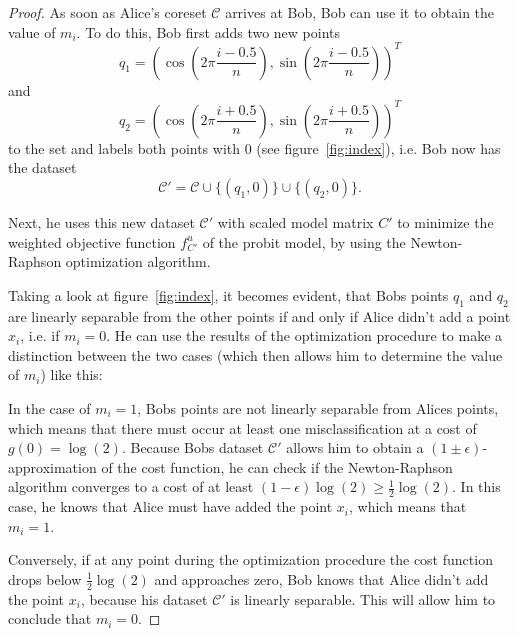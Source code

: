 \begin{proof}
    As soon as Alice's coreset $\mathcal{C}$ arrives at Bob,
    Bob can use it to obtain the value of $m_i$.
    To do this, Bob first adds two new points
    \begin{equation*}
        q_1 = \left( \cos{\left(2 \pi \frac{i - 0.5}{n}\right)},
        \sin{\left(2 \pi \frac{i - 0.5}{n}\right)} \right)^T
    \end{equation*}
    and
    \begin{equation*}
        q_2 = \left( \cos{\left(2 \pi \frac{i + 0.5}{n}\right)},
        \sin{\left(2 \pi \frac{i + 0.5}{n}\right)} \right)^T
    \end{equation*}
    to the set and labels both points with $0$ (see figure~\ref{fig:index}),
    i.e. Bob now has the dataset
    \begin{equation*}
        \mathcal{C}' = \mathcal{C} \cup \{(q_1, 0)\} \cup \{(q_2, 0)\}.
    \end{equation*}

    Next, he uses this new dataset $\mathcal{C}'$ with
    scaled model matrix $C'$ to
    minimize the weighted objective function
    $f_{C'}^u$ of the probit model,
    by using the Newton-Raphson optimization algorithm.

    Taking a look at figure~\ref{fig:index}, it becomes evident,
    that Bobs points $q_1$ and $q_2$ are linearly separable from
    the other points if and only if Alice didn't add a point
    $x_i$, i.e. if $m_i = 0$.
    He can use the results of the optimization procedure to
    make a distinction between the two cases
    (which then allows him to determine the value of $m_i$)
    like this:

    In the case of $m_i=1$, Bobs points are not linearly separable from
    Alices points, which means that there must occur at least one
    misclassification at a cost of $g(0) = \log(2)$.
    Because Bobs dataset $\mathcal{C}'$ allows him to obtain a
    $(1 \pm \epsilon)$-approximation of the cost function, he can
    check if the Newton-Raphson algorithm converges to
    a cost of at least $(1 - \epsilon) \log(2) \geq \frac{1}{2} \log(2)$.
    In this case, he knows that Alice must have added the point $x_i$,
    which means that $m_i=1$.

    Conversely, if at any point during the optimization procedure
    the cost function drops below
    $\frac{1}{2} \log(2)$
    and approaches zero, Bob knows that Alice didn't add the point
    $x_i$, because his dataset $\mathcal{C}'$ is linearly separable.
    This will allow him to conclude that $m_i = 0$.


\end{proof}
